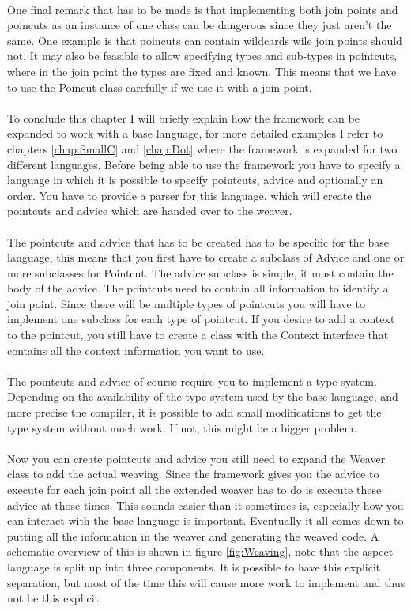 \documentclass[a4paper]{report}
\begin{document}
\\
One final remark that has to be made is that implementing both join points and poincuts as an instance of one class can be dangerous since they just aren't the same. One example is that poincuts can contain wildcards wile join points should not. It may also be feasible to allow specifying types and sub-types in pointcuts, where in the join point the types are fixed and known. This means that we have to use the Poincut class carefully if we use it with a join point.\\
\\
To conclude this chapter I will briefly explain how the framework can be expanded to work with a base language, for more detailed examples I refer to chapters \ref{chap:SmallC} and \ref{chap:Dot} where the framework is expanded for two different languages. Before being able to use the framework you have to specify a language in which it is possible to specify pointcuts, advice and optionally an order. You have to provide a parser for this language, which will create the pointcuts and advice which are handed over to the weaver.\\
\\
The pointcuts and advice that has to be created has to be specific for the base language, this means that you first have to create a subclass of Advice and one or more subclasses for Pointcut.
The advice subclass is simple, it must contain the body of the advice. The pointcuts need to contain all information to identify a join point. Since there will be multiple types of pointcuts you will have to implement one subclass for each type of pointcut. If you desire to add a context to the pointcut, you still have to create a class with the Context interface that contains all the context information you want to use.\\
\\
The pointcuts and advice of course require you to implement a type system. Depending on the availability of the type system used by the base language, and more precise the compiler, it is possible to add small modifications to get the type system without much work. If not, this might be a bigger problem.\\
\\
Now you can create pointcuts and advice you still need to expand the Weaver class to add the actual weaving. Since the framework gives you the advice to execute for each join point all the extended weaver has to do is execute these advice at those times. This sounds easier than it sometimes is, especially how you can interact with the base language is important. Eventually it all comes down to putting all the information in the weaver and generating the weaved code. A schematic overview of this is shown in figure \ref{fig:Weaving}, note that the aspect language is split up into three components. It is possible to have this explicit separation, but most of the time this will cause more work to implement and thus not be this explicit.
\end{document}
